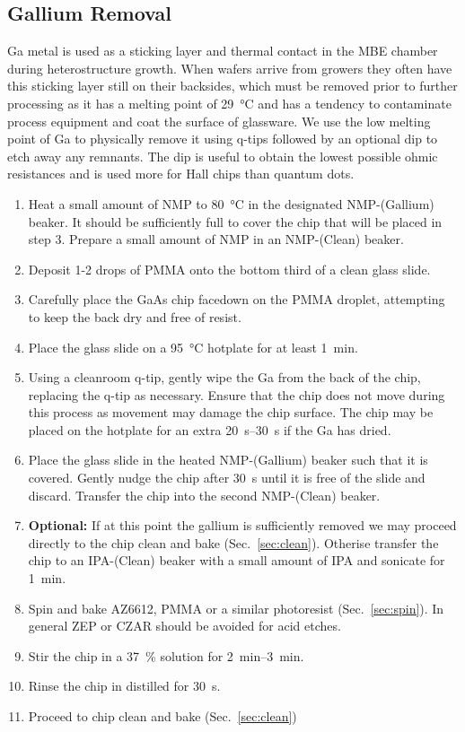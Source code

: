 \subsection{Gallium Removal}
\label{sec:garem}
Ga metal is used as a sticking layer and thermal contact in the MBE chamber during heterostructure growth. When wafers
arrive from growers they often have this sticking layer still on their backsides, which must be removed prior to further processing
as it has a melting point of \SI{29}{\celsius} and has a tendency to contaminate process equipment and coat the surface of glassware.
We use the low melting point of Ga to physically remove it using q-tips followed by an optional  dip to etch away any remnants.
The  dip is useful to obtain the lowest possible ohmic resistances and is used more for Hall chips than quantum dots.
\begin{enumerate}
    \item Heat a small amount of NMP to \SI{80}{\celsius} in the designated NMP-(Gallium) beaker. It should be sufficiently full to cover the chip that will be placed in step 3. Prepare a small amount of NMP in an NMP-(Clean) beaker.
    \item Deposit 1-2 drops of PMMA onto the bottom third of a clean glass slide.
    \item Carefully place the GaAs chip facedown on the PMMA droplet, attempting to keep the back dry and free of resist.
    \item Place the glass slide on a \SI{95}{\celsius} hotplate for at least \SI{1}{\minute}.
    \item Using a cleanroom q-tip, gently wipe the Ga from the back of the chip, replacing the q-tip as necessary. Ensure that the chip does not move during this process as movement may damage the chip surface. The chip may be placed on the hotplate for an extra \SIrange{20}{30}{\second} if the Ga has dried.
    \item Place the glass slide in the heated NMP-(Gallium) beaker such that it is covered. Gently nudge the chip after \SI{30}{\second} until it is free of the slide and discard. Transfer the chip into the second NMP-(Clean) beaker.
    \item \textbf{Optional:} If at this point the gallium is sufficiently removed we may proceed directly to the chip clean and bake (Sec.~\ref{sec:clean}). Otherise transfer the chip to an IPA-(Clean) beaker with a small amount of IPA and sonicate for \SI{1}{\minute}.
    \item Spin and bake AZ6612, PMMA or a similar photoresist (Sec.~\ref{sec:spin}). In general ZEP or CZAR should be avoided for acid etches.
    \item Stir the chip in a \SI{37}{\percent}  solution for \SIrange{2}{3}{\minute}.
    \item Rinse the chip in distilled  for \SI{30}{\second}.
    \item Proceed to chip clean and bake (Sec.~\ref{sec:clean})
\end{enumerate}


